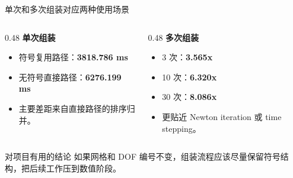 \documentclass[UTF8,aspectratio=169,10pt]{ctexbeamer}
\newcommand{\metric}[1]{\textcolor{pgsaGreen}{\textbf{#1}}}
\begin{document}
\begin{frame}{单次和多次组装对应两种使用场景}
\begin{columns}[T,onlytextwidth]
\begin{column}{0.48\textwidth}
\textbf{单次组装}
\begin{itemize}
  \item 符号复用路径：\metric{3818.786 ms}
  \item 无符号直接路径：\metric{6276.199 ms}
  \item 主要差距来自直接路径的排序归并。
\end{itemize}
\end{column}
\begin{column}{0.48\textwidth}
\textbf{多次组装}
\begin{itemize}
  \item 3 次：\metric{3.565x}
  \item 10 次：\metric{6.320x}
  \item 30 次：\metric{8.086x}
  \item 更贴近 Newton iteration 或 time stepping。
\end{itemize}
\end{column}
\end{columns}
\begin{alertblock}{对项目有用的结论}
如果网格和 DOF 编号不变，组装流程应该尽量保留符号结构，把后续工作压到数值阶段。
\end{alertblock}
\end{frame}
\end{document}
